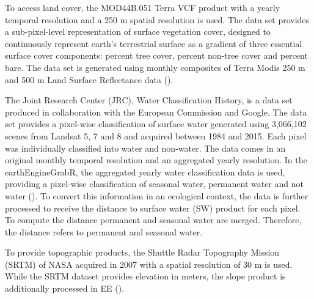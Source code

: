 To access land cover, the MOD44B.051 Terra VCF product with a yearly temporal resolution and a 250 m spatial resolution is used. The data set provides a sub-pixel-level representation of surface vegetation cover, designed to continuously represent earth's terrestrial surface as a gradient of three essential surface cover components: percent tree cover, percent non-tree cover and percent bare. The data set is generated using monthly composites of Terra Modis 250 m and 500 m Land Surface Reflectance data (\cite{hansen2006vegetation}).

The Joint Research Center (JRC), Water Classification History, is a data set produced in collaboration with the European Commission and Google. 
The data set provides a pixel-wise classification of surface water generated using 3,066,102 scenes from Landsat 5, 7 and 8 and acquired between 1984 and 2015. Each pixel was individually classified into water and non-water. The data comes in an original monthly temporal resolution and an aggregated yearly resolution. In the earthEngineGrabR, the aggregated yearly water classification data is used, providing a pixel-wise classification of seasonal water, permanent water and not water (\cite{pekel2016high}). To convert this information in an ecological context, the data is further processed to receive the distance to surface water (SW) product for each pixel. To compute the distance permanent and seasonal water are merged. Therefore, the distance refers to permanent and seasonal water.

To provide topographic products, the Shuttle Radar Topography Mission (SRTM) of NASA acquired in 2007 with a spatial resolution of 30 m is used. While the SRTM dataset provides elevation in meters, the slope product is additionally processed in EE (\cite{farr2007shuttle}). 

